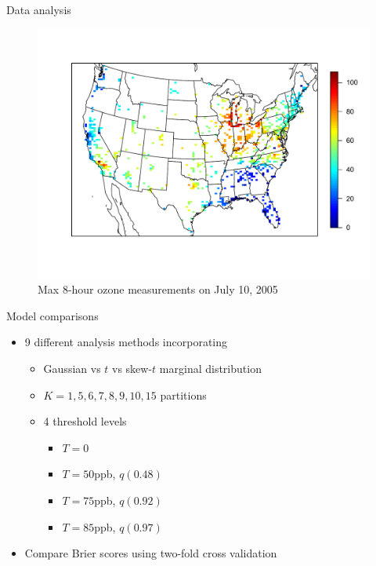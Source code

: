 \documentclass{beamer}
\begin{document}
\begin{frame}{Data analysis}
  \centering
  \begin{figure}
    \includegraphics[width=\linewidth, trim=0 1in 0 0.7in ]{./plots/pot/ozone-10jul-us.pdf}
    \caption{Max 8-hour ozone measurements on July 10, 2005}
   \end{figure}
\end{frame}


\begin{frame}{Model comparisons}
  \begin{itemize} \setlength{\itemsep}{1em}
    \item 9 different analysis methods incorporating \vspace{0.5em}
    \begin{itemize} \setlength{\itemsep}{0.5em}
      \item Gaussian vs $t$ vs skew-$t$ marginal distribution
      \item $K=1, 5, 6, 7, 8, 9, 10, 15$ partitions
      \item 4 threshold levels \vspace{0.25em}
      \begin{itemize} \setlength{\itemsep}{0.25em}
         \item $T = 0$
         \item $T = 50$ppb, $q(0.48)$
         \item $T = 75$ppb, $q(0.92)$
         \item $T = 85$ppb, $q(0.97)$
      \end{itemize}
    \end{itemize}
    \item Compare Brier scores using two-fold cross validation
  \end{itemize}
\end{frame}
\end{document}

